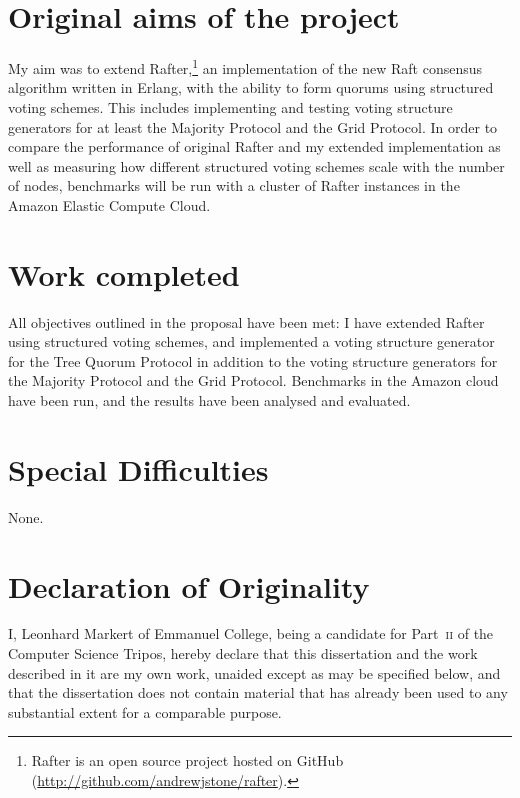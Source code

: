 \documentclass[draft,11pt,chapterprefix=true,toc=bibliography,numbers=noendperiod,
               footnotes=multiple,twoside]{scrreprt}
\begin{document}
\section*{Original aims of the project\label{sc:original-aims}}

My aim was to extend Rafter,\footnote{Rafter is an open source project hosted on GitHub (\url{http://github.com/andrewjstone/rafter}).} an implementation of the new Raft \autocite{raft} consensus algorithm written in Erlang, with the ability to form quorums using structured voting schemes. This includes implementing and testing voting structure generators for at least the Majority Protocol and the Grid Protocol. In order to compare the performance of original Rafter and my extended implementation as well as measuring how different structured voting schemes scale with the number of nodes, benchmarks will be run with a cluster of Rafter instances in the Amazon Elastic Compute Cloud.

\section*{Work completed\label{sc:work-completed}}

All objectives outlined in the proposal have been met: I have extended Rafter using structured voting schemes, and implemented a voting structure generator for the Tree Quorum Protocol in addition to the voting structure generators for the Majority Protocol and the Grid Protocol. Benchmarks in the Amazon cloud have been run, and the results have been analysed and evaluated.

\section*{Special Difficulties\label{sc:special-difficulties}}

None.

\newpage

\section*{Declaration of Originality\label{sc:declaration-of-originality}}

I, Leonhard Markert of Emmanuel College, being a candidate for Part~\textsc{ii} of the Computer Science Tripos, hereby declare that this dissertation and the work described in it are my own work, unaided except as may be specified below, and that the dissertation does not contain material that has already been used to any substantial extent for a comparable purpose.
\end{document}
